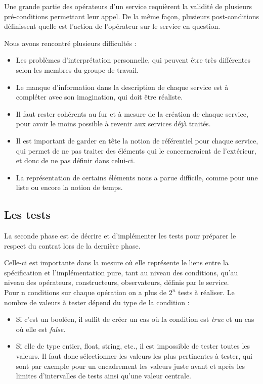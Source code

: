 \documentclass[a4paper, 11pt, notitlepage]{article}
\begin{document}
Une grande partie des opérateurs d'un service requièrent la validité de plusieurs pré-conditions permettant leur appel. De la même façon, plusieurs post-conditions définissent quelle est l'action de l'opérateur sur le service en question.

Nous avons rencontré plusieurs difficultés :
\begin{itemize}
\item Les problèmes d’interprétation personnelle, qui peuvent être
  très différentes selon les membres du groupe de travail.
\item Le manque d'information dans la description de chaque service
  est à compléter avec son imagination, qui doit être réaliste.
\item Il faut rester cohérents au fur et à mesure de la création de
  chaque service, pour avoir le moins possible à revenir aux services
  déjà traités. 
\item Il est important de garder en tête la notion de référentiel pour
  chaque service, qui permet de ne pas traiter des éléments qui
  le concerneraient de l'extérieur, et donc de ne pas définir dans celui-ci.

\item La représentation de certains éléments nous a parue difficile,
  comme pour une liste ou encore la notion de temps.
\end{itemize}

\subsection{Les tests}
La seconde phase est de décrire et d'implémenter les tests pour préparer
le respect du contrat lors de la dernière phase.

Celle-ci est importante dans la mesure où elle représente le liens
entre la spécification et l'implémentation pure, tant au niveau des
conditions, qu'au niveau des opérateurs, constructeurs, observateurs, définis par le service. \\

Pour n conditions sur chaque opération on a plus de $2^n$ tests à réaliser.
Le nombre de valeurs à tester dépend du type de la condition : 
\begin{itemize}
\item Si c'est un booléen, il suffit de créer un cas où la condition est \emph{true} et un cas où elle est \emph{false}.
\item Si elle de type entier, float, string, etc., il est impossible de tester toutes
les valeurs. Il faut donc sélectionner les valeurs les plus
pertinentes à tester, qui sont par exemple pour un encadrement les valeurs juste avant et
après les limites d'intervalles de tests ainsi qu'une valeur centrale. \\
\end{itemize}
\end{document}
